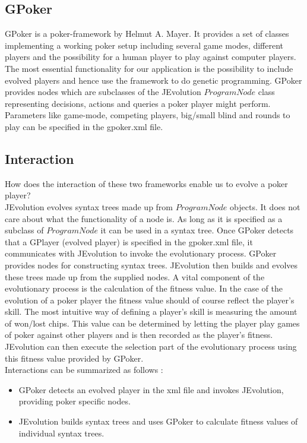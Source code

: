 \documentclass[12pt,fleqn,a4paper]{article}
\begin{document}
\subsection{GPoker}
GPoker is a poker-framework by Helmut A. Mayer. It provides a set of classes implementing a working poker setup including several game modes, different players and the
possibility for a human player to play against computer players. The most essential functionality for our application is the possibility to include evolved players and hence
use the framework to do genetic programming. GPoker provides nodes which are subclasses of the JEvolution $ProgramNode$ class representing decisions, actions and queries a
poker player might perform. Parameters like game-mode, competing players, big/small blind and rounds to play can be specified in the gpoker.xml file.

\subsection{Interaction}
How does the interaction of these two frameworks enable us to evolve a poker player?  \\
JEvolution evolves syntax trees made up from $ProgramNode$ objects. It does not care about what the functionality of a node is. As long
as it is specified as a subclass of $ProgramNode$ it can be used in a syntax tree.
Once GPoker detects that a GPlayer (evolved player) is specified in the gpoker.xml file, it communicates with JEvolution to invoke the evolutionary process.  GPoker provides nodes 
for constructing syntax trees. JEvolution then builds and evolves these trees made up from the supplied nodes. A vital component of the evolutionary process is the calculation of the fitness value. In the case
of the evolution of a poker player the fitness value should of course reflect the player's skill. The most intuitive way of defining a player's skill is measuring the amount of won/lost chips.
This value can be determined by letting the player play games of poker against other players and is then recorded as the player's fitness. JEvolution can then execute the selection part
of the evolutionary process using this fitness value provided by GPoker.
\\
Interactions can be summarized as follows :
\begin{itemize}
	\item GPoker detects an evolved player in the xml file and invokes JEvolution, providing poker specific nodes.
	\item JEvolution builds syntax trees and uses GPoker to calculate fitness values of individual syntax trees.
\end{itemize}
\end{document}
